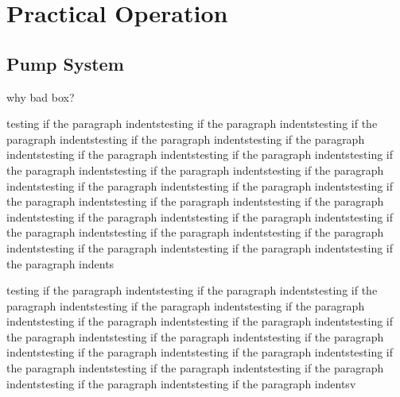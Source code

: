 \chapter{Practical Operation} 
\label{practical-op}  

\section{Pump System}
why bad box?

testing if the paragraph indentstesting if the paragraph indentstesting if the paragraph indentstesting if the paragraph indentstesting if the paragraph indentstesting if the paragraph indentstesting if the paragraph indentstesting if the paragraph indentstesting if the paragraph indentstesting if the paragraph indentstesting if the paragraph indentstesting if the paragraph indentstesting if the paragraph indentstesting if the paragraph indentstesting if the paragraph indentstesting if the paragraph indentstesting if the paragraph indentstesting if the paragraph indentstesting if the paragraph indentstesting if the paragraph indentstesting if the paragraph indentstesting if the paragraph indentstesting if the paragraph indents


testing if the paragraph indentstesting if the paragraph indentstesting if the paragraph indentstesting if the paragraph indentstesting if the paragraph indentstesting if the paragraph indentstesting if the paragraph indentstesting if the paragraph indentstesting if the paragraph indentstesting if the paragraph indentstesting if the paragraph indentstesting if the paragraph indentstesting if the paragraph indentstesting if the paragraph indentstesting if the paragraph indentstesting if the paragraph indentstesting if the paragraph indentsv